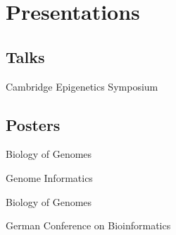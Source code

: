\documentclass{klmr-cv}
\begin{document}
\section{Presentations}

\subsection{Talks}

\begin{itemize}
    \listitem
        \date{2014}
        Cambridge Epigenetics Symposium
\end{itemize}

\subsection{Posters}

\begin{itemize}
    \listitem
        \date{2015}
        Biology of Genomes
    \listitem
        \date{2014}
        Genome Informatics
    \listitem
        \date{2013}
        Biology of Genomes
    \listitem
        \date{2009}
        German Conference on Bioinformatics
\end{itemize}
\end{document}
